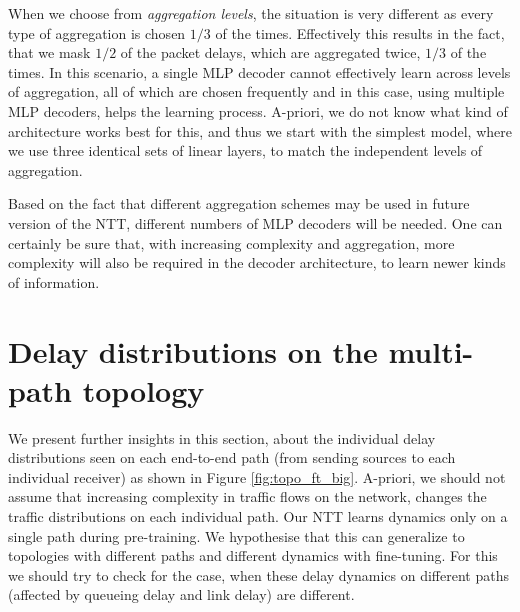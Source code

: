 When we choose from \emph{aggregation levels}, the situation is very different as every type of aggregation is chosen $1/3$ of the times. Effectively this results in the fact, that we mask $1/2$ of the packet delays, which are aggregated twice, $1/3$ of the times. In this scenario, a single MLP decoder cannot effectively learn across levels of aggregation, all of which are chosen frequently and in this case, using multiple MLP decoders, helps the learning process. A-priori, we do not know what kind of architecture works best for this, and thus we start with the simplest model, where we use three identical sets of linear layers, to match the independent levels of aggregation.

Based on the fact that different aggregation schemes may be used in future version of the NTT, different numbers of MLP decoders will be needed. One can certainly be sure that, with increasing complexity and aggregation, more complexity will also be required in the decoder architecture, to learn newer kinds of information.

\chapter{Delay distributions on the multi-path topology}
\label{app:c}

We present further insights in this section, about the individual delay distributions seen on each end-to-end path (from sending sources to each individual receiver) as shown in Figure \ref{fig:topo_ft_big}. A-priori, we should not assume that increasing complexity in traffic flows on the network, changes the traffic distributions on each individual path. Our NTT learns dynamics only on a single path during pre-training. We hypothesise that this can generalize to topologies with different paths and different dynamics with fine-tuning. For this we should try to check for the case, when these delay dynamics on different paths (affected by queueing delay and link delay) are different.

